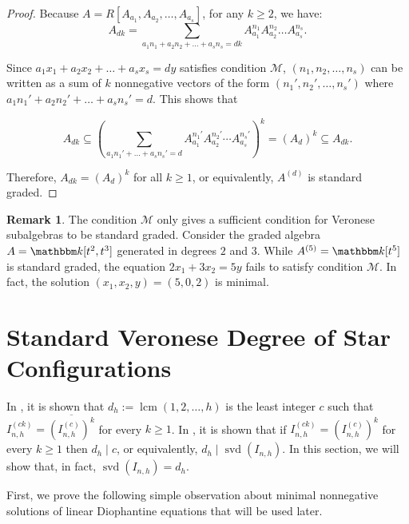 \documentclass[12pt]{amsart}
\numberwithin{equation}{section}
\theoremstyle{definition}
\newtheorem{remark}[theorem]{Remark}
\DeclareMathOperator{\lcm}{lcm}
\DeclareMathOperator{\svd}{svd}
\newcommand{\kk}{{\mathbbm k}}
\begin{document}
\begin{proof}
    Because $A=R[A_{a_1},A_{a_2},\ldots, A_{a_s}]$, for any $k\ge 2$, we have: 
$$A_{dk}=\sum_{a_1n_1+a_2n_2+\ldots + a_sn_s=dk}A_{a_1}^{n_1}A_{a_2}^{n_2}\ldots A_{a_s}^{n_s}.$$

Since $a_1x_1+a_2x_2+\ldots +a_sx_s = dy$ satisfies condition $\mathcal{M}$, $(n_1,n_2,\ldots,n_s)$ can be written as a sum of $k$ nonnegative vectors of the form $(n_1',n_2',\ldots ,n_s')$ where $a_1n_1'+a_2n_2'+\ldots + a_sn_s'=d$. This shows that 

\[
A_{dk} \subseteq \left( \sum_{a_1n_1' + \ldots + a_sn_s' = d} A_{a_1}^{n_1'}A_{a_2}^{n_2'}\cdots A_{a_s}^{n_s'}  \right)^k = (A_d)^k \subseteq A_{dk}.
\]

Therefore, $A_{dk}=(A_d)^k$ for all $k\ge 1$, or equivalently, $A^{(d)}$ is standard graded. 
\end{proof}

\begin{remark}
    \label{rem.SVDandMinSol}
    The condition $\mathcal{M}$ only gives a sufficient condition for Veronese subalgebras to be standard graded. Consider the graded algebra $A = \kk[t^2, t^3]$ generated in degrees $2$ and $3$. While $A^{(5)}=\kk[t^5]$ is standard graded, the equation $2x_1 + 3x_2 = 5y$ fails to satisfy condition $\mathcal{M}$. In fact, the solution $(x_1, x_2, y) = (5, 0, 2)$ is minimal. 
\end{remark}


\section{Standard Veronese Degree of Star Configurations}

In \cite[Example 6.7]{TaiThaiNOBody}, it is shown that $d_h:=\lcm(1,2,\ldots ,h)$ is the least integer $c$ such that $I_{n,h}^{(ck)}=\overline{(I_{n,h}^{(c)})^k}$ for every $k\ge 1$. In \cite[Example 3.9]{symbolicReesSurvey}, it is shown that if $I_{n,h}^{(ck)}=(I_{n,h}^{(c)})^k$ for every $k\ge 1$ then $d_h \mid c$, or equivalently, $d_h \mid \svd(I_{n,h})$. In this section, we will show that, in fact, $\svd(I_{n,h})=d_h$.\par
\vspace{0.5em}

First, we prove the following simple observation about minimal nonnegative solutions of linear Diophantine equations that will be used later.
\end{document}
